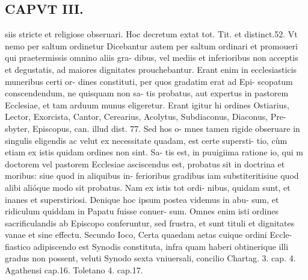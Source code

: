 \documentclass{article}
\begin{document}
\begin{pages}
\section*{CAPVT  III. }
\marginpar{[ p.147 ]}\pstart siis stricte et religiose obseruari. Hoc decretum extat tot. Tit. et distinct.52. Vt nemo per saltum ordinetur Dicebantur autem per saltum ordinari et promoueri qui praetermissis omnino aliis gra- dibus, vel mediis et inferioribus non acceptis et degustatis, ad maiores dignitates prouchebantur. Erant enim in ecclesiasticis muneribus certi or- dines constituti, per quos gradatim erat ad Epi- scopatum conscendendum, ne quisquam non sa- tis probatus, aut expertus in pastorem Ecclesiae, et tam arduum munus eligeretur. Erant igitur hi ordines Ostiarius, Lector, Exorcista, Cantor, Cerearius, Acolytus, Subdiaconus, Diaconus, Pre- sbyter, Episcopus, can. illud dist. 77. Sed hos o- mnes tamen rigide obseruare in singulis eligendis ac velut ex necessitate quadam, est certe supersti- tio, cùm etiam ex istis quidam ordines non sint. Sa- tis est, in puuigiima ratione io, qui m doctorem vel pastorem Ecclesiae asciscendus est, probatus sit in doctrina et moribus: siue quod in aliquibus in- ferioribus gradibus iam substiteritisiue quod alibi alióque  modo sit probatus. Nam ex istis tot ordi- nibus, quidam sunt, et inanes et superstiriosi.  \pend\pstart Denique hoc ipsum postea videmus in abu- sum, et ridiculum quiddam in Papatu fuisse conuer- sum. Omnes enim isti ordines sacrificulandis ab Episcopo conferuntur, sed frustra, et sunt tituli et dignitates vanae et sine effectu. Secundo Ioco, Certa quaedam aetas cuique ordini Eccle- fiastico adipiscendo est Synodis constituta, infra quam haberi obtinerique illi gradus non possent, veluti Synodo sexta vniuersali, concilio Chartag. 3. cap. 4. Agathensi cap.16. Toletano 4. cap.17.  \pend

\end{pages}
\end{document}
